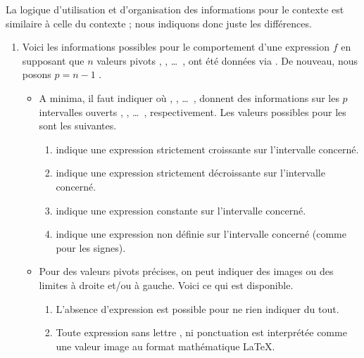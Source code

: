 La logique d'utilisation et d'organisation des informations pour le contexte  est similaire à celle du contexte  ; nous indiquons donc juste les différences.
%
\begin{enumerate}
    \item Voici les informations possibles pour le comportement d'une expression $f$ en supposant que $n$ valeurs pivots  ,  , \dots\ ,  ont été données via  . De nouveau, nous posons $p = n - 1$ .
    \begin{itemize}
        \item A minima, il faut indiquer
        où
         ,  , \dots\ , 
        donnent des informations sur les $p$ intervalles ouverts
        \tdocinlatex{]x_1 ; x_2[} , \tdocinlatex{]x_2 ; x_3[} , \dots\ , \tdocinlatex{]x_p ; x_n[} respectivement.
        Les valeurs possibles pour les  sont les suivantes.
        \begin{enumerate}
            \item \tdocinlatex{<} indique une expression strictement croissante sur l'intervalle concerné.

            \item \tdocinlatex{>} indique une expression strictement décroissante sur l'intervalle concerné.

            \item \tdocinlatex{=} indique une expression constante sur l'intervalle concerné.

            \item {} indique une expression non définie sur l'intervalle concerné (comme pour les signes).
        \end{enumerate}


        \item Pour des valeurs pivots précises, on peut indiquer des images ou des limites à droite et/ou à gauche. Voici ce qui est disponible.
        \begin{enumerate}
            \item L'absence d'expression est possible pour ne rien indiquer du tout.

            \item Toute expression sans lettre , ni ponctuation \tdocinlatex{!} est interprétée comme une valeur image au format mathématique \LaTeX.


\end{enumerate}
\end{itemize}
\end{enumerate}
